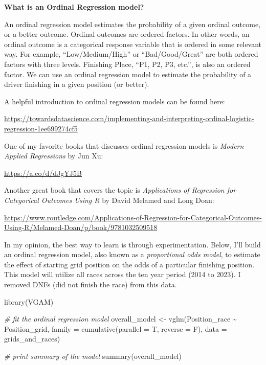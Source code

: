 \documentclass[
]{book}
\newenvironment{Shaded}{\begin{snugshade}}{\end{snugshade}}
\newcommand{\AttributeTok}[1]{\textcolor[rgb]{0.77,0.63,0.00}{#1}}
\newcommand{\CommentTok}[1]{\textcolor[rgb]{0.56,0.35,0.01}{\textit{#1}}}
\newcommand{\FunctionTok}[1]{\textcolor[rgb]{0.00,0.00,0.00}{#1}}
\newcommand{\NormalTok}[1]{#1}
\newcommand{\OtherTok}[1]{\textcolor[rgb]{0.56,0.35,0.01}{#1}}
\newcommand{\SpecialCharTok}[1]{\textcolor[rgb]{0.00,0.00,0.00}{#1}}
\begin{document}
\begin{blackbox}

\begin{center}
\textbf{What is an Ordinal Regression model?}

\end{center}

An ordinal regression model estimates the probability of a given ordinal outcome, or a better outcome. Ordinal outcomes are ordered factors. In other words, an ordinal outcome is a categorical response variable that is ordered in some relevant way. For example, ``Low/Medium/High'' or ``Bad/Good/Great'' are both ordered factors with three levels. Finishing Place, ``P1, P2, P3, etc.'', is also an ordered factor. We can use an ordinal regression model to estimate the probability of a driver finishing in a given position (or better).

A helpful introduction to ordinal regression models can be found here:

\url{https://towardsdatascience.com/implementing-and-interpreting-ordinal-logistic-regression-1ee699274cf5}

One of my favorite books that discusses ordinal regression models is \emph{Modern Applied Regressions} by Jun Xu:

\url{https://a.co/d/dJgYJ5B}

Another great book that covers the topic is \emph{Applications of Regression for Categorical Outcomes Using R} by David Melamed and Long Doan:

\url{https://www.routledge.com/Applications-of-Regression-for-Categorical-Outcomes-Using-R/Melamed-Doan/p/book/9781032509518}

\end{blackbox}

In my opinion, the best way to learn is through experimentation. Below, I'll build an ordinal regression model, also known as a \emph{proportional odds model}, to estimate the effect of starting grid position on the odds of a particular finishing position. This model will utilize all races across the ten year period (2014 to 2023). I removed DNFs (did not finish the race) from this data.

\begin{Shaded}
\begin{Highlighting}[]
\FunctionTok{library}\NormalTok{(VGAM)}


\CommentTok{\# fit the ordinal regression model}
\NormalTok{overall\_model }\OtherTok{\textless{}{-}} \FunctionTok{vglm}\NormalTok{(Position\_race }\SpecialCharTok{\textasciitilde{}}\NormalTok{ Position\_grid, }
                      \AttributeTok{family =} \FunctionTok{cumulative}\NormalTok{(}\AttributeTok{parallel =}\NormalTok{ T, }\AttributeTok{reverse =}\NormalTok{ F),}
                      \AttributeTok{data =}\NormalTok{ grids\_and\_races)}

\CommentTok{\# print summary of the model}
\FunctionTok{summary}\NormalTok{(overall\_model)}
\end{Highlighting}
\end{Shaded}
\end{document}
